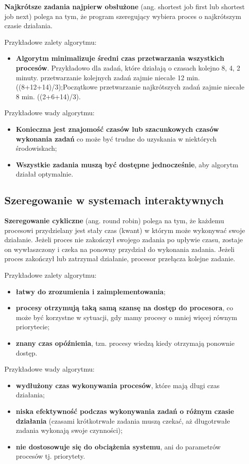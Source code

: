 \documentclass{article}
\begin{document}
\textbf{Najkrótsze zadania najpierw obsłużone} (ang. shortest job first lub shortest job next) polega na tym, że program szeregujący wybiera proces o najkrótszym czasie działania.

Przykładowe zalety algorytmu:
\begin{itemize}
    \item \textbf{Algorytm minimalizuje średni czas przetwarzania wszystkich procesów}. Przykładowo dla zadań, które działają o czasach kolejno 8, 4, 2 minuty. przetwarzanie kolejnych zadań zajmie niecałe 12 min. ((8+12+14)/3);Początkowe przetwarzanie najkrótszych zadań zajmie niecałe 8 min. ((2+6+14)/3).
\end{itemize}

Przykładowe wady algorytmu:
\begin{itemize}
    \item \textbf{Konieczna jest znajomość czasów lub szacunkowych czasów wykonania zadań} co może być trudne do uzyskania w niektórych środowiskach;
    \item \textbf{Wszystkie zadania muszą być dostępne jednocześnie}, aby algorytm działał optymalnie.
\end{itemize}

\subsection*{Szeregowanie w systemach interaktywnych}
\textbf{Szeregowanie cykliczne} (ang. round robin) polega na tym, że każdemu procesowi przydzielany jest stały czas (kwant) w którym może wykonywać swoje działanie. Jeżeli proces nie zakończył swojego zadania po upływie czasu, zostaje on wywłaszczony i czeka na ponowny przydział do wykonania zadania. Jeżeli proces zakończył lub zatrzymał działanie, procesor przełącza kolejne zadanie.

Przykładowe zalety algorytmu:
\begin{itemize}
    \item \textbf{łatwy do zrozumienia i zaimplementowania};
    \item \textbf{procesy otrzymują taką samą szansę na dostęp do procesora}, co może być korzystne w sytuacji, gdy mamy procesy o mniej więcej równym priorytecie;
    \item \textbf{znany czas opóźnienia}, tzn. procesy wiedzą kiedy otrzymają ponownie dostęp.
\end{itemize}

Przykładowe wady algorytmu:
\begin{itemize}
    \item \textbf{wydłużony czas wykonywania procesów}, które mają długi czas działania;
    \item \textbf{niska efektywność podczas wykonywania zadań o różnym czasie działania} (czasami krótkotrwałe zadania muszą czekać, aż długotrwałe zadania wykonają swoje czynności);
    \item \textbf{nie dostosowuje się do obciążenia systemu}, ani do parametrów procesów tj. priorytety.
\end{itemize}
\end{document}

